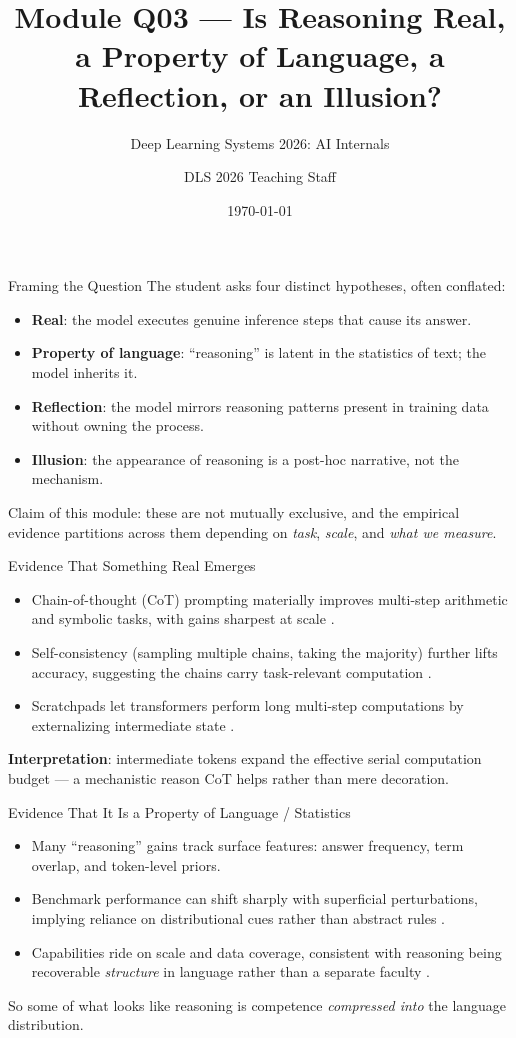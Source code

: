 \documentclass[aspectratio=169,11pt]{beamer}
\title{Module Q03 --- Is Reasoning Real, a Property of Language, a Reflection, or an Illusion?}
\subtitle{Deep Learning Systems 2026: AI Internals}
\author{DLS 2026 Teaching Staff}
\date{\today}
\begin{document}
\begin{frame}
  \titlepage
\end{frame}

\begin{frame}{Framing the Question}
  The student asks four distinct hypotheses, often conflated:
  \begin{itemize}
    \item \textbf{Real}: the model executes genuine inference steps that cause its answer.
    \item \textbf{Property of language}: ``reasoning'' is latent in the statistics of text; the model inherits it.
    \item \textbf{Reflection}: the model mirrors reasoning patterns present in training data without owning the process.
    \item \textbf{Illusion}: the appearance of reasoning is a post-hoc narrative, not the mechanism.
  \end{itemize}
  \alert{Claim of this module}: these are not mutually exclusive, and the empirical evidence partitions across them depending on \emph{task}, \emph{scale}, and \emph{what we measure}.
\end{frame}

\begin{frame}{Evidence That Something Real Emerges}
  \begin{itemize}
    \item Chain-of-thought (CoT) prompting materially improves multi-step arithmetic and symbolic tasks, with gains sharpest at scale \citep{wei2022chain}.
    \item Self-consistency (sampling multiple chains, taking the majority) further lifts accuracy, suggesting the chains carry task-relevant computation \citep{wang2022selfconsistency}.
    \item Scratchpads let transformers perform long multi-step computations by externalizing intermediate state \citep{nye2021scratchpad}.
  \end{itemize}
  \textbf{Interpretation}: intermediate tokens expand the effective serial computation budget --- a mechanistic reason CoT helps rather than mere decoration.
\end{frame}

\begin{frame}{Evidence That It Is a Property of Language / Statistics}
  \begin{itemize}
    \item Many ``reasoning'' gains track surface features: answer frequency, term overlap, and token-level priors.
    \item Benchmark performance can shift sharply with superficial perturbations, implying reliance on distributional cues rather than abstract rules \citep{mccoy2019right}.
    \item Capabilities ride on scale and data coverage, consistent with reasoning being recoverable \emph{structure} in language rather than a separate faculty \citep{brown2020language}.
  \end{itemize}
  So some of what looks like reasoning is competence \emph{compressed into} the language distribution.
\end{frame}
\end{document}
